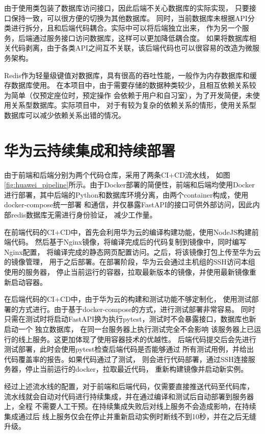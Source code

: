 由于使用类包装了数据库访问接口，因此后端不关心数据库的实际实现，
只要接口保持一致，可以很方便的切换为其他数据库。
同时，当前数据库未根据API分类进行拆分，且和后端代码耦合。实际中可以将后端独立出来，
作为另一个服务，后端通过服务接口访问数据库，这样可以更加降低耦合度。
如果将数据库相关代码剥离，由于各类API之间互不关联，该后端代码也可以很容易的改造为微服务架构。

Redis作为轻量级键值对数据库，具有很高的吞吐性能，一般作为内存数据库和缓存数据库使用。
在本项目中，由于需要存储的数据种类较少，且相互依赖关系较为简单（仅预定座位时，预定操作
会依赖于用户和自习室），为了开发简便，未使用关系型数据库。实际项目中，
对于有较为复杂的依赖关系的情形，使用关系型数据库可以减少依赖关系出错的情况。

\section{华为云持续集成和持续部署}

由于前端和后端分别为两个代码仓库，采用了两条CI+CD流水线，
如图\ref{fig:huawei_pipeline}所示。由于Docker部署的简便性，前端和后端均使用Docker
进行部署，其中后端的Python和数据库环境分离，由两个container构成，使用docker-compose统一部署
和通信，并仅暴露FastAPI的接口可供外部访问，因此内部redis数据库无需进行身份验证，
减少工作量。

在前端代码的CI+CD中，首先会利用华为云的编译构建功能，使用NodeJS构建前端代码。
然后基于Nginx镜像，将编译完成后的代码复制到镜像中，同时编写Nginx配置，
将编译完成的静态网页配置访问。之后，将该镜像打包上传至华为云的镜像管理，
用于之后部署。在部署阶段，华为云会通过主机组的SSH访问本组使用的服务器，
停止当前运行的容器，拉取最新版本的镜像，并使用最新镜像重新启动容器。

在后端代码的CI+CD中，由于华为云的构建和测试功能不够定制化，
使用测试部署的方式进行。由于基于docker-compose的方式，进行测试部署非常容易。
同时只需在测试时将启动FastAPI换为执行pytest，测试时不会暴露接口，数据库也新启动一个
独立数据库， 在同一台服务器上执行测试完全不会影响
该服务器上已运行的线上服务。这更加体现了使用容器技术的优越性。
后端代码提交后会先进行测试部署，此时会使用pytest检查后端代码是否能够通过
所有测试用例，并给出代码覆盖率的报告。如果代码通过了测试，
则会进行代码部署，通过SSH连接服务器，停止当前运行的docker，拉取最近代码，
重新构建镜像并启动新实例。

经过上述流水线的配置，对于前端和后端代码，仅需要直接推送代码至代码库，
流水线就会自动对代码进行持续集成，并在通过编译和测试后自动部署到服务器上，全程
不需要人工干预。在持续集成失败后对线上服务不会造成影响，在持续集成通过后
线上服务仅会在停止并重新启动实例时断线不到10秒，并在之后无缝升级。

